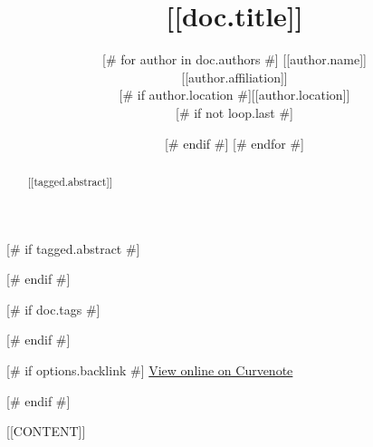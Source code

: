\documentclass{article}
\title{[[doc.title]]}
\date{\displaydate{articleDate}}
[# else #]
\date{}
[# endif #]
\author{[# for author in doc.authors #]
[[author.name]]\\
[# if author.affiliation #][[author.affiliation]]\\[# endif #]
[# if author.location #][[author.location]]\\[# endif #]
[# if not loop.last #]
\and
[# endif #]
[# endfor #]
}
\begin{document}
\maketitle

[# if tagged.abstract #]
\begin{abstract}
  [[tagged.abstract]]
\end{abstract}

[# endif #]


[# if doc.tags #]

[# endif #]

[# if options.backlink #]
\footnotesize
\href{[[doc.oxalink]]}{View online on Curvenote}

\normalsize
[# endif #]

[[CONTENT]]




\end{document}
